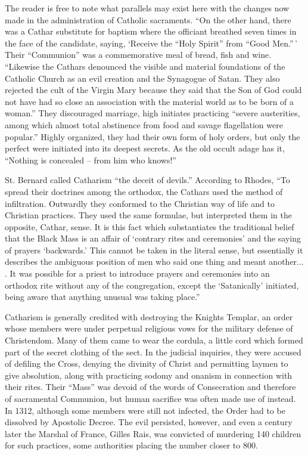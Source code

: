 The reader is free to note what parallels may exist here with the changes now made in the administration of Catholic sacraments. ``On the other hand, there was a Cathar substitute for baptism where the officiant breathed seven times in the face of the candidate, saying, `Receive the ``Holy Spirit'' from ``Good Men.''\,' Their ``Communion'' was a commemorative meal of bread, fish and wine. ``Likewise the Cathars denounced the visible and material foundations of the Catholic Church as an evil creation and the Synagogue of Satan. They also rejected the cult of the Virgin Mary because they said that the Son of God could not have had so close an association with the material world as to be born of a woman.'' They discouraged marriage, high initiates practicing ``severe austerities, among which almost total abstinence from food and savage flagellation were popular.'' Highly organized, they had their own form of holy orders, but only the perfect were initiated into its deepest secrets. As the old occult adage has it, ``Nothing is concealed -- from him who knows!''

St. Bernard called Catharism ``the deceit of devils.'' According to Rhodes, ``To spread their doctrines among the orthodox, the Cathars used the method of infiltration. Outwardly they conformed to the Christian way of life and to Christian practices. They used the same formulae, but interpreted them in the opposite, Cathar, sense. It is this fact which substantiates the traditional belief that the Black Mass is an affair of `contrary rites and ceremonies' and the saying of prayers `backwards.' This cannot be taken in the literal sense, but essentially it describes the ambiguous position of men who said one thing and meant another... . It was possible for a priest to introduce prayers and ceremonies into an orthodox rite without any of the congregation, except the `Satanically' initiated, being aware that anything unusual was taking place.''

Catharism is generally credited with destroying the Knights Templar, an order whose members were under perpetual religious vows for the military defense of Christendom. Many of them came to wear the cordula, a little cord which formed part of the secret clothing of the sect. In the judicial inquiries, they were accused of defiling the Cross, denying the divinity of Christ and permitting laymen to give absolution, along with practicing sodomy and onanism in connection with their rites. Their ``Mass'' was devoid of the words of Consecration and therefore of sacramental Communion, but human sacrifice was often made use of instead. In 1312, although some members were still not infected, the Order had to be dissolved by Apostolic Decree. The evil persisted, however, and even a century later the Marshal of France, Gilles Rais, was convicted of murdering 140 children for such practices, some authorities placing the number closer to 800.

